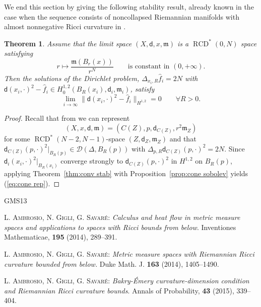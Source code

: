 \documentclass[a4paper,11pt,reqno]{article}
\numberwithin{equation}{section}
\theoremstyle{plain}
\newtheorem{theorem}{Theorem}[section]
\theoremstyle{definition}
\theoremstyle{remark}
\newcommand{\dist}{\mathsf{d}}
\newcommand{\meas}{\mathfrak{m}}
\DeclareMathOperator{\RCD}{RCD}
\begin{document}
{We end this section by giving the following stability result, already known in the case when the sequence consists of noncollapsed Riemannian manifolds with almost nonnegative Ricci curvature in \cite{CheegerColding}.

\begin{theorem}\label{thm:metric cone distance}
Assume that the limit space $(X, \dist, x,\meas)$ is a $\RCD^*(0,N)$ space satisfying
$$r \mapsto \frac{\meas (B_r(x))}{r^N}\qquad\text{is constant in $(0,+\infty)$}.$$
Then the solutions of the Dirichlet problem, $\Delta_{x_i,R} \hat{f}_i=2N$ with $\dist (x_i, \cdot )^2-\hat{f}_i \in H^{1, 2}_0(B_R(x_i), \dist_i, \meas_i)$, satisfy
\begin{equation}\label{eq:cone rep}
\lim_{i\to\infty}\|\dist ( x_i, \cdot)^2 -\hat{f}_i\|_{H^{1, 2}}= 0\qquad\forall R>0.
\end{equation}
\end{theorem}
\begin{proof}
Recall that from \cite{DePhilippisGigli} we can represent
$$
(X, x, \dist, \meas) = (C(Z), p, \dist_{C(Z)}, r^2\meas_Z)
$$
for some $\RCD^*(N-2,N-1)$-space $(Z, \dist_Z, \meas_Z)$ and that 
$\dist_{C(Z)} (p, \cdot)^2 \vert_{B_R(p)} \in \mathcal{D}(\Delta, B_R(p))$ with 
$\Delta_{p,R} \dist_{C(Z)} (p, \cdot)^2=2N$.
Since $\dist_i(x_i, \cdot)^2\vert_{B_R(x_i)}$ converge strongly to $\dist_{C(Z)}(p, \cdot)^2$ in $H^{1, 2}$ on $B_R(p)$, 
applying Theorem~\ref{thm:conv stab} with Proposition~\ref{prop:cone sobolev} yields (\ref{eq:cone rep}).
\end{proof}

\begin{thebibliography}{GMS13}

	\textsc{L. Ambrosio, N. Gigli, G. Savar\'e}:
	\textit{Calculus and heat flow in metric measure spaces and applications to spaces with Ricci bounds from below}.
	Inventiones Mathematicae, \textbf{195} (2014), 289--391.

	\textsc{L. Ambrosio, N. Gigli, G. Savar\'e}:
	\textit{Metric measure spaces with Riemannian Ricci curvature bounded from below.}
	Duke Math. J. \textbf{163} (2014), 1405--1490.     
	
       \textsc{L. Ambrosio, N. Gigli, G. Savar\'e}:
       \textit{Bakry-\'Emery curvature-dimension condition and Riemannian Ricci curvature bounds}.
       Annals of Probability, \textbf{43} (2015), 339--404.


\end{thebibliography}}
\end{document}
